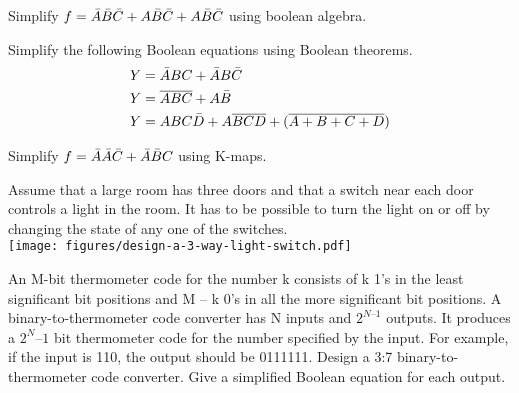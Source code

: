 \begin{example}
  Simplify $f = \bar{A}\bar{B}\bar{C} + A \bar{B}\bar{C} + A\bar{B}\bar{C} $ using boolean algebra.
\end{example}
\vspace{10em}

\begin{prob}
Simplify the following Boolean equations using Boolean theorems.
\begin{align}
 Y &= \bar{A} BC + \bar{A} B\bar{C}\\
Y &= \overline{ABC} + A\bar{B}\\
Y &= ABC\bar{D} + A\overline{BCD} + (\overline{A + B + C + D})
\end{align}
\end{prob}

\begin{example}
  Simplify $f = \bar{A}\bar{A}\bar{C} + \bar{A}\bar{B} C $ using K-maps.
\end{example}
\vspace{10em}


\begin{example}
  Assume that a large room has three doors and that a switch near each door controls a light in the room. It has to be possible to turn the light on or off by changing the state of any one
  of the switches.\\
  \texttt{[image: figures/design-a-3-way-light-switch.pdf]}
\end{example}
\vspace{10em}

\begin{prob}
An M-bit thermometer code for the number k consists of k 1’s in the
least significant bit positions and M – k 0’s in all the more significant bit positions.
A binary-to-thermometer code converter has N inputs and $2^{N–1}$ outputs. It
produces a $2^N–1$ bit thermometer code for the number specified by the input.
For example, if the input is 110, the output should be 0111111. Design a 3:7
binary-to-thermometer code converter. Give a simplified Boolean equation for
each output.
\end{prob}

